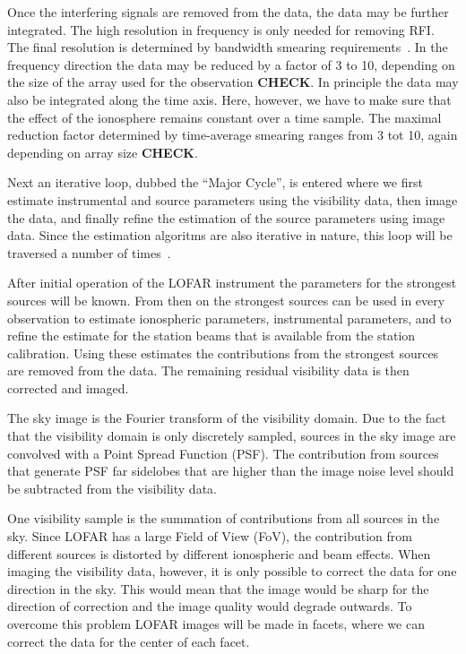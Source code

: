\documentclass[journal]{IEEEtran}
\begin{document}
Once the interfering signals are removed from the data, the data may be further integrated. The high resolution in frequency is only needed for removing RFI. The final resolution is determined by bandwidth smearing requirements~\cite{SIRAII:99}. In the frequency direction the data may be reduced by a factor of 3 to 10, depending on the size of the array used for the observation {\bf CHECK}. In principle the data may also be integrated along the time axis. Here, however, we have to make sure that the effect of the ionosphere remains constant over a time sample. The maximal reduction factor determined by time-average smearing ranges from 3 tot 10, again depending on array size {\bf CHECK}.

Next an iterative loop, dubbed the ``Major Cycle'', is entered where we first estimate instrumental and source parameters using the visibility data, then image the data, and finally refine the estimation  of the source parameters using image data. Since the estimation algoritms are also iterative in nature, this loop will be traversed a number of times~\cite{Nijboer:07}. 

After initial operation of the LOFAR instrument the parameters for the strongest sources will be known. From then on the strongest sources can be used in every observation to estimate ionospheric parameters, instrumental parameters, and to refine the estimate for the station beams that is available from the station calibration. Using these estimates the contributions from the strongest sources are removed from the data. The remaining residual visibility data is then corrected and imaged.

The sky image is the Fourier transform of the visibility domain. Due to the fact that the visibility domain is only discretely sampled, sources in the sky image are convolved with a Point Spread Function (PSF). The contribution from sources that generate PSF far sidelobes that are higher than the image noise level should be subtracted from the visibility data.

One visibility sample is the summation of contributions from all sources in the sky. Since LOFAR has a large Field of View (FoV), the contribution from different sources is distorted by different ionospheric and beam effects. When imaging the visibility data, however, it is only possible to correct the data for one direction in the sky. This would mean that the image would be sharp for the direction of correction and the image quality would degrade outwards. To overcome this problem LOFAR images will be made in facets, where we can correct the data for the center of each facet. 
\end{document}
